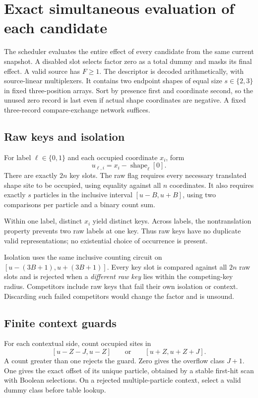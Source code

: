 \documentclass[11pt,a4paper]{article}
\numberwithin{equation}{section}
\begin{document}
\section{Exact simultaneous evaluation of each candidate}\label{fpa:eb:sec:factor}
The scheduler evaluates the entire effect of every candidate from the same current snapshot. A disabled slot selects factor zero as a total dummy and masks its final effect. A valid source has $F\geq1$. The descriptor is decoded arithmetically, with source-linear multiplexers. It contains two endpoint shapes of equal size $s\in\{2,3\}$ in fixed three-position arrays. Sort by presence first and coordinate second, so the unused zero record is last even if actual shape coordinates are negative. A fixed three-record compare-exchange network suffices.

\subsection{Raw keys and isolation}
For label $\ell\in\{0,1\}$ and each occupied coordinate $x_i$, form
\[
u_{\ell,i}=x_i-\operatorname{shape}_{\ell}[0].
\]
There are exactly $2n$ key slots. The raw flag requires every necessary translated shape site to be occupied, using equality against all $n$ coordinates. It also requires exactly $s$ particles in the inclusive interval $[u-B,u+B]$, using two comparisons per particle and a binary count sum.

Within one label, distinct $x_i$ yield distinct keys. Across labels, the nontranslation property prevents two raw labels at one key. Thus raw keys have no duplicate valid representations; no existential choice of occurrence is present.

Isolation uses the same inclusive counting circuit on $[u-(3B+1),u+(3B+1)]$. Every key slot is compared against all $2n$ raw slots and is rejected when a \emph{different raw key} lies within the competing-key radius. Competitors include raw keys that fail their own isolation or context. Discarding such failed competitors would change the factor and is unsound.

\subsection{Finite context guards}
For each contextual side, count occupied sites in
\[
[u-Z-J,u-Z]\qquad\text{or}\qquad[u+Z,u+Z+J].
\]
A count greater than one rejects the guard. Zero gives the overflow class $J+1$. One gives the exact offset of its unique particle, obtained by a stable first-hit scan with Boolean selections. On a rejected multiple-particle context, select a valid dummy class before table lookup.
\end{document}
